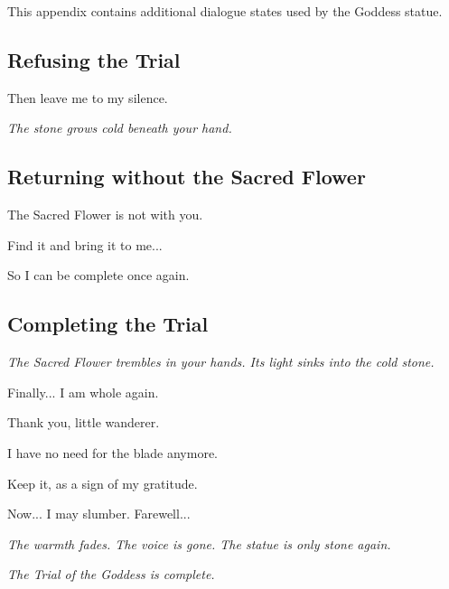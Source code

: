 This appendix contains additional dialogue states used by the Goddess statue.

\subsection{Refusing the Trial}

\begin{tcolorbox}[
    title={Refusing the trial},
    colback=gray!5,
    colframe=gray!60,
    arc=2mm,
    boxrule=0.5pt
]
    Then leave me to my silence.

    \medskip

    \textit{The stone grows cold beneath your hand.}
\end{tcolorbox}

\subsection{Returning without the Sacred Flower}

\begin{tcolorbox}[
    title={Returning without the Sacred Flower},
    colback=gray!5,
    colframe=gray!60,
    arc=2mm,
    boxrule=0.5pt
]
    The Sacred Flower is not with you.

    \medskip

    Find it and bring it to me...

    \medskip

    So I can be complete once again.
\end{tcolorbox}

\subsection{Completing the Trial}

\begin{tcolorbox}[
    title={Completing the trial},
    colback=gray!5,
    colframe=gray!60,
    arc=2mm,
    boxrule=0.5pt
]
    \textit{The Sacred Flower trembles in your hands.
    Its light sinks into the cold stone.}

    \medskip

    Finally... I am whole again.

    \medskip

    Thank you,
    little wanderer.

    \medskip

    I have no need for the blade anymore.

    \medskip

    Keep it,
    as a sign of my gratitude.

    \medskip

    Now... I may slumber.
    Farewell...

    \medskip

    \textit{The warmth fades.
    The voice is gone.
    The statue is only stone again.}

    \medskip

    \textit{The Trial of the Goddess is complete.}
\end{tcolorbox}




